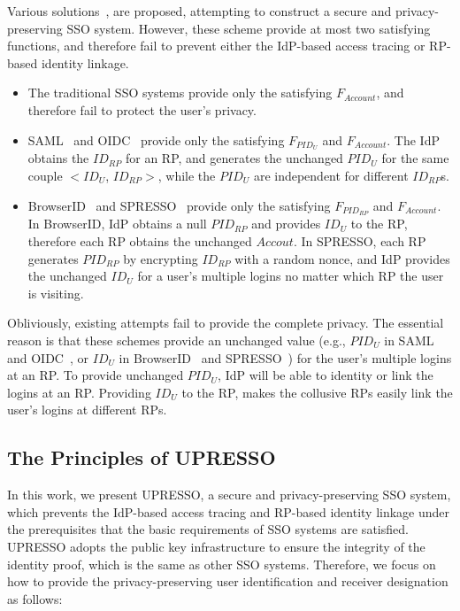 Various solutions~\cite{OpenIDConnect, SAMLIdentifier,BrowserID,SPRESSO}, are proposed, attempting to construct a secure and privacy-preserving SSO system.
However, these scheme provide at most two satisfying functions, and therefore fail to prevent either the IdP-based access tracing or RP-based identity linkage.
\begin{itemize}
  \item The traditional SSO systems provide only the satisfying $F_{Account}$, and therefore fail to protect the user's privacy.
  \item SAML~\cite{SAMLIdentifier} and OIDC~\cite{OpenIDConnect} provide only the satisfying $F_{PID_{U}}$ and $F_{Account}$.
        The IdP obtains the $ID_{RP}$ for an RP, and generates the unchanged $PID_{U}$ for the same couple $<ID_{U}$, $ID_{RP}>$,
        while the $PID_{U}$ are independent for different $ID_{RP}$s.
  \item BrowserID~\cite{BrowserID} and SPRESSO~\cite{SPRESSO} provide only the satisfying $F_{PID_{RP}}$ and $F_{Account}$.
        In BrowserID, IdP obtains a null $PID_{RP}$ and provides $ID_U$ to the RP, therefore each RP obtains the unchanged $Accout$.
        In SPRESSO, each RP generates $PID_{RP}$ by encrypting $ID_{RP}$ with a random nonce,
        and IdP provides the unchanged $ID_U$ for a user's multiple logins no matter which RP the user is visiting.
\end{itemize}

Obliviously, existing attempts fail to provide the complete  privacy.
The essential reason is that these schemes provide an unchanged value (e.g., $PID_{U}$ in SAML~\cite{SAMLIdentifier} and OIDC~\cite{OpenIDConnect}, or $ID_U$ in BrowserID~\cite{BrowserID} and SPRESSO~\cite{SPRESSO}) for the user's multiple logins at an RP.
To provide unchanged $PID_{U}$, IdP will be able to identity or link the logins at an RP.
Providing $ID_U$ to the RP, makes  the collusive RPs easily link the user's logins at different RPs.


\subsection{The Principles of UPRESSO}
\label{subsec:solutions}
In this work, we present UPRESSO, a secure and privacy-preserving SSO system,
which prevents the IdP-based access tracing and RP-based identity linkage under the prerequisites that  the basic requirements of SSO systems are satisfied.
UPRESSO adopts the public key infrastructure to ensure the integrity of the identity proof, which is the same as other SSO systems.
Therefore, we focus on how to provide the privacy-preserving user identification and receiver designation as follows:

